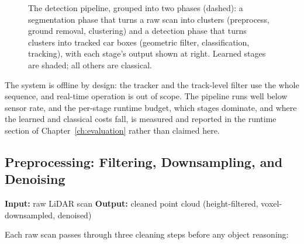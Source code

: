 \begin{figure}[H]
  \caption[Detection pipeline]{The detection pipeline, grouped into two phases (dashed): a
    segmentation phase that turns a raw scan into clusters (preprocess, ground removal,
    clustering) and a detection phase that turns clusters into tracked car boxes
    (geometric filter, classification, tracking), with each stage's output shown at right.
    Learned stages are shaded; all others are classical.}
  \label{fig:pipeline}
\end{figure}

The system is offline by design: the tracker and the track-level filter
use the whole sequence, and real-time operation is out of scope. The pipeline runs well
below sensor rate, and the per-stage runtime budget, which stages dominate, and where
the learned and classical costs fall, is measured and reported in the runtime section
of Chapter~\ref{ch:evaluation} rather than claimed here.

\subsection{Preprocessing: Filtering, Downsampling, and Denoising}
\label{sec:pipeline-preprocess}

\noindent \textbf{Input:} raw LiDAR scan \quad \textbar \quad \textbf{Output:} cleaned point cloud (height-filtered, voxel-downsampled, denoised) \vspace{0.5em}

Each raw scan passes through three cleaning steps
before any object reasoning:

